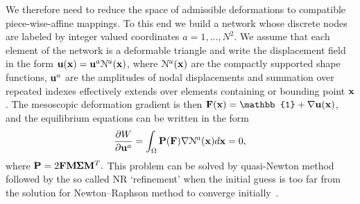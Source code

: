 \documentclass[CRPHYS,Unicode,manuscript]{cedram}
\begin{document}
 We therefore  need to reduce the space of admissible deformations   to compatible piece-wise-affine mappings.  To this end we   build  a  network whose discrete nodes are labeled by  integer valued coordinates $a =1,..., N^2$. We assume that each   element of the network is a deformable triangle  and write  the displacement field   in the form ${\bf u} ({ \bf x})= {\bf u}^a {\mathcal N}^a(\bf x )$, where ${\mathcal N}^a(\bf x)$ are  the  compactly supported  shape functions,  ${\bf u}^a$ are the amplitudes of nodal displacements and summation over repeated indexes effectively extends over elements containing or  bounding point $\bf x$. 
%
%
%
The  mesoscopic deformation gradient is   then    ${\bf F}(\bf x)  = \mathbb{1}  +\nabla {\bf u}(\bf x)$, 
and the 
 equilibrium equations can be written in the form
\begin{equation}
\label{numerics}
\frac{\partial W}{\partial {\bf u}^a }=\int _{\Omega} {\bf P}({\bf F}) \nabla {\mathcal N}^a ({\bf x}) d  {\bf x}  =0,
\end{equation}
where  ${\bf P} = 2 {\bf F } {\bf M } {\pmb \Sigma } {\bf M}  ^T.$  This problem   can be solved by quasi-Newton  method followed by the  so called  NR `refinement'  when  the initial guess is too far from the solution for Newton–Raphson method  to converge initially~\cite{Tadmor1996-qi}. 

\end{document}
